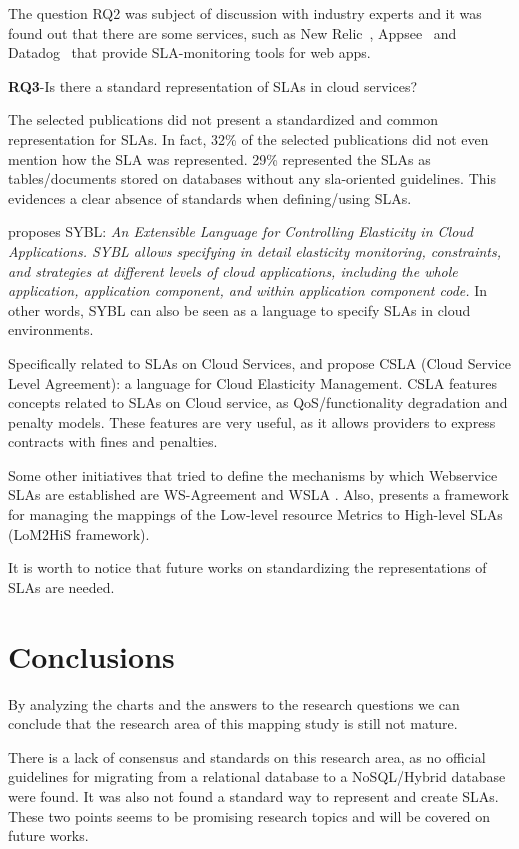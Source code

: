 \documentclass[conference, 10pt, a4paper]{IEEEtran}
\begin{document}
The question RQ2 was subject of discussion with industry experts and it was found out that there are some services, such as New Relic~\cite{newrelic}, Appsee~\cite{appsee} and Datadog~\cite{datadog} that provide SLA-monitoring tools for web apps.

\bigskip
\noindent\textbf{RQ3}-Is there a standard representation of SLAs in cloud services? 

The selected publications did not present a standardized and common representation for SLAs. In fact, 32\% of the selected publications did not even mention how the SLA was represented. 29\% represented the SLAs as tables/documents stored on databases without any sla-oriented guidelines. This evidences a clear absence of standards when defining/using SLAs.

\cite{6546068} proposes SYBL: \textit{An Extensible Language for Controlling Elasticity in Cloud Applications. SYBL allows specifying in detail elasticity monitoring, constraints, and strategies at different levels of cloud applications, including the whole application, application component, and within application component code.} In other words, SYBL can also be seen as a language to specify SLAs in cloud environments.  

Specifically related to SLAs on Cloud Services, \cite{6846456} and \cite{kouki:hal-00675077} propose CSLA (Cloud Service Level Agreement): a language for Cloud Elasticity Management. CSLA features concepts related to SLAs on Cloud service,  as QoS/functionality degradation and penalty models. These features are very useful, as it allows providers to express contracts with fines and penalties. 

Some other initiatives that tried to define the mechanisms by which Webservice SLAs are established are WS-Agreement \cite{citeulike:2805191} and WSLA \cite{4578560}. Also, \cite{5547150} presents a framework for managing the mappings of the Low-level resource Metrics to High-level SLAs (LoM2HiS framework). 


It is worth to notice that future works on standardizing the representations of SLAs are needed. 

\section{Conclusions}
By analyzing the charts and the answers to the research questions we can conclude that the research area of this mapping study is still not mature. 

There is a lack of consensus and standards on this research area, as no official guidelines for migrating from a relational database to a NoSQL/Hybrid database were found. It was also not found a standard way to represent and create SLAs. These two points seems to be promising research topics and will be covered on future works.


%


	
\end{document}
